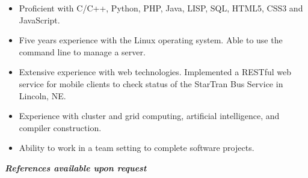 \documentclass[12pt]{report}
\begin{document}
\begin{center}
{{
\begin{itemize}
\item Proficient with C/C++, Python, PHP, Java, LISP, SQL, HTML5, CSS3 and JavaScript.
\item Five years experience with the Linux operating system. Able to use the command line to manage a server.
\item Extensive experience with web technologies.  Implemented a RESTful web service for mobile clients to check status of the StarTran Bus Service in Lincoln, NE.
\item Experience with cluster and grid computing, artificial intelligence, and compiler construction.
\item Ability to work in a team setting to complete software projects.
\end{itemize}
}}

\noindent\textbf{\textit{References available upon request}}
\end{center}

\noindent\colorbox{MidnightBlue}{%
\noindent\parbox{8.0in}{\textcolor{White}{%
\begin{center}
\vspace{0.0625in}
\vspace{0.0625in}
\end{center}
}}}
\end{document}
